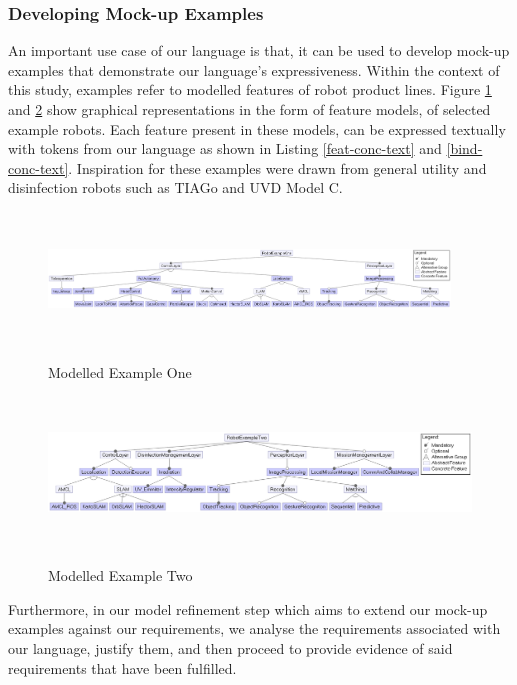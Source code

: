 \documentclass[conference]{IEEEtran}
\begin{document}
\subsubsection{Developing Mock-up Examples}
An important use case of our language is that, it can be used to develop mock-up examples that demonstrate our language's expressiveness. Within the context of this study, examples refer to modelled features of robot product lines. Figure \ref{ex1} and \ref{ex2} show graphical representations in the form of feature models, of selected example robots. Each feature present in these models, can be expressed textually with tokens from our language as shown in Listing \ref{feat-conc-text} and \ref{bind-conc-text}. Inspiration for these examples were drawn from general utility and disinfection robots such as TIAGo and UVD Model C.
    
\begin{figure}[h]
\caption{Modelled Example One}
\centering
\includegraphics[width=0.95\textwidth,height=3.5cm]{diagrams/ex1.png}
\label{ex1}
\end{figure}

\begin{figure}[h]
\caption{Modelled Example Two}
\centering
\includegraphics[width=1.0\textwidth,height=4cm]{diagrams/ex2.png}
\label{ex2}
\end{figure}
    
Furthermore, in our model refinement step which aims to extend our mock-up examples against our requirements, we analyse the requirements associated with our language, justify them, and then proceed to provide evidence of said requirements that have been fulfilled.
\end{document}
